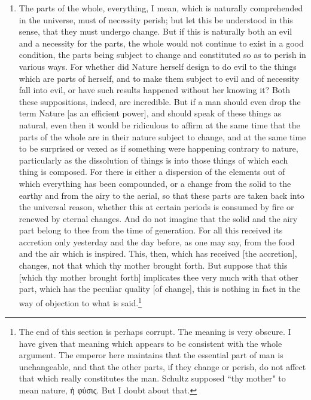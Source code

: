 \begin{enumerate}
\item The parts of the whole, everything, I mean, which is naturally comprehended in the universe, must of necessity perish; but let this be understood in this sense, that they must undergo change. But if this is naturally both an evil and a necessity for the parts, the whole would not continue to exist in a good condition, the parts being subject to change and constituted so as to perish in various ways. For whether did Nature herself design to do evil to the things which are parts of herself, and to make them subject to evil and of necessity fall into evil, or have such results happened without her knowing it? Both these suppositions, indeed, are incredible. But if a man should even drop the term Nature [{\clarify as an efficient power}], and should speak of these things as natural, even then it would be ridiculous to affirm at the same time that the parts of the whole are in their nature subject to change, and at the same time to be surprised or vexed as if something were happening contrary to nature, particularly as the dissolution of things is into those things of which each thing is composed. For there is either a dispersion of the elements out of which everything has been compounded, or a change from the solid to the earthy and from the airy to the aerial, so that these parts are taken back into the universal reason, whether this at certain periods is consumed by fire or renewed by eternal changes. And do not imagine that the solid and the airy part belong to thee from the time of generation. For all this received its accretion only yesterday and the day before, as one may say, from the food and the air which is inspired. This, then, which has received [{\clarify the accretion}], changes, not that which thy mother brought forth. But suppose that this [{\clarify which thy mother brought forth}] implicates thee very much with that other part, which has the peculiar quality [{\clarify of change}], this is nothing in fact in the way of objection to what is said.\footnote{ The end of this section is perhaps corrupt. The meaning is very obscure. I have given that meaning which appears to be consistent with the whole argument. The emperor here maintains that the essential part of man is unchangeable, and that the other parts, if they change or perish, do not affect that which really constitutes the man. Schultz supposed ``thy mother" to mean nature, \textgreek{ἡ φύσις}. But I doubt about that.}


\end{enumerate}
